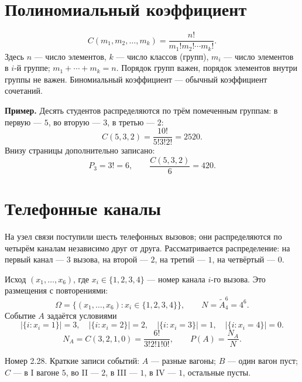 


\section*{Полиномиальный коэффициент}
\[
 C(m_1,m_2,\ldots,m_k)=\frac{n!}{m_1!m_2!\cdots m_k!}.
\]
Здесь $n$ --- число элементов, $k$ --- число классов (групп),
$m_i$ --- число элементов в $i$-й группе; $m_1+\cdots+m_k=n$.
Порядок групп важен, порядок элементов внутри группы не важен.
Биномиальный коэффициент --- обычный коэффициент сочетаний.

\textbf{Пример.} Десять студентов распределяются по трём помеченным группам:
в первую --- $5$, во вторую --- $3$, в третью --- $2$:
\[
 C(5,3,2)=\frac{10!}{5!3!2!}=2520.
\]
Внизу страницы дополнительно записано:
\[
 P_3=3!=6,\qquad \frac{C(5,3,2)}{6}=420.
\]

\section*{Телефонные каналы}
На узел связи поступили шесть телефонных вызовов; они распределяются
по четырём каналам независимо друг от друга. Рассматривается распределение:
на первый канал --- $3$ вызова, на второй --- $2$, на третий --- $1$,
на четвёртый --- $0$.

Исход $(x_1,\ldots,x_6)$, где $x_i\in\{1,2,3,4\}$ --- номер канала
$i$-го вызова. Это размещения с повторениями:
\[
 \Omega=\{(x_1,\ldots,x_6):x_i\in\{1,2,3,4\}\},\qquad
 N=\widetilde A_4^6=4^6.
\]
Событие $A$ задаётся условиями
\[
 |\{i:x_i=1\}|=3,\quad |\{i:x_i=2\}|=2,\quad
 |\{i:x_i=3\}|=1,\quad |\{i:x_i=4\}|=0.
\]
\[
 N_A=C(3,2,1,0)=\frac{6!}{3!2!1!0!},\qquad P(A)=\frac{N_A}{N}.
\]

Номер 2.28. Краткие записи событий:
$A$ --- разные вагоны; $B$ --- один вагон пуст;
$C$ --- в I вагоне $5$, во II --- $2$, в III --- $1$, в IV --- $1$,
остальные пусты.

